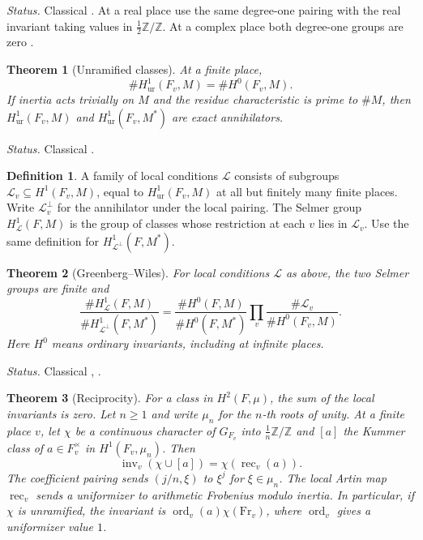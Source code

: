 \documentclass[reqno]{amsart}
\theoremstyle{definition}
\newtheorem{definition}{Definition}[section]
\theoremstyle{plain}
\newtheorem{theorem}{Theorem}[section]
\newcommand{\Z}{\mathbb Z}
\newcommand{\Lc}{\mathcal L}
\newcommand{\Fr}{\mathrm{Fr}}
\newcommand{\inv}{\operatorname{inv}}
\newcommand{\rec}{\operatorname{rec}}
\newcommand{\ur}{\mathrm{ur}}
\begin{document}
\emph{Status.} Classical \cite[(7.2.6), (7.3.1)]{NSW}.  At a real place use
the same degree-one pairing with the real invariant taking values in
\(\tfrac12\Z/\Z\).  At a complex place both degree-one groups are zero
\cite{NSW}.

\begin{theorem}[Unramified classes]\label{thm:unramified}
At a finite place,
\[
  \#H^1_{\ur}(F_v,M)=\#H^0(F_v,M).
\]
If inertia acts trivially on \(M\) and the residue characteristic
is prime to \(\#M\), then \(H^1_{\ur}(F_v,M)\) and
\(H^1_{\ur}(F_v,M^*)\) are exact annihilators.
\end{theorem}

\emph{Status.} Classical \cite[(1.7.7)(i), (7.2.14), (7.2.15)]{NSW}.

\begin{definition}\label{def:local-conditions}
A family of local conditions \(\Lc\) consists of subgroups
\(\Lc_v\subseteq H^1(F_v,M)\), equal to \(H^1_{\ur}(F_v,M)\) at all but
finitely many finite places.  Write \(\Lc_v^\perp\) for the annihilator
under the local pairing.  The Selmer group \(H^1_{\Lc}(F,M)\) is the
group of classes whose restriction at each \(v\) lies in \(\Lc_v\).
Use the same definition for \(H^1_{\Lc^\perp}(F,M^*)\).
\end{definition}

\begin{theorem}[Greenberg--Wiles]\label{thm:gw}
For local conditions \(\Lc\) as above, the two Selmer groups are finite and
\[
  \frac{\#H^1_{\Lc}(F,M)}{\#H^1_{\Lc^\perp}(F,M^*)}
  = \frac{\#H^0(F,M)}{\#H^0(F,M^*)}
    \prod_v \frac{\#\Lc_v}{\#H^0(F_v,M)} .
\]
Here \(H^0\) means ordinary invariants, including at infinite places.
\end{theorem}

\emph{Status.} Classical \cite[Thm.~2.19]{DDT}, \cite[(8.7.9)]{NSW}.

\begin{theorem}[Reciprocity]\label{thm:reciprocity}
For a class in \(H^2(F,\mu)\), the sum of the local invariants is zero.
Let \(n\ge 1\) and write \(\mu_n\) for the \(n\)-th roots of unity.
At a finite place \(v\), let \(\chi\) be a continuous character of
\(G_{F_v}\) into \(\tfrac1n\Z/\Z\) and \([a]\) the Kummer class of
\(a\in F_v^\times\) in \(H^1(F_v,\mu_n)\).  Then
\[
  \inv_v(\chi\cup[a])=\chi(\rec_v(a)).
\]
The coefficient pairing sends \((j/n,\xi)\) to \(\xi^j\) for \(\xi\in\mu_n\).
The local Artin map \(\rec_v\) sends a uniformizer to arithmetic
Frobenius modulo inertia.  In particular, if \(\chi\)
is unramified, the invariant is
\(\operatorname{ord}_v(a)\chi(\Fr_v)\), where \(\operatorname{ord}_v\)
gives a uniformizer value \(1\).
\end{theorem}
\end{document}
